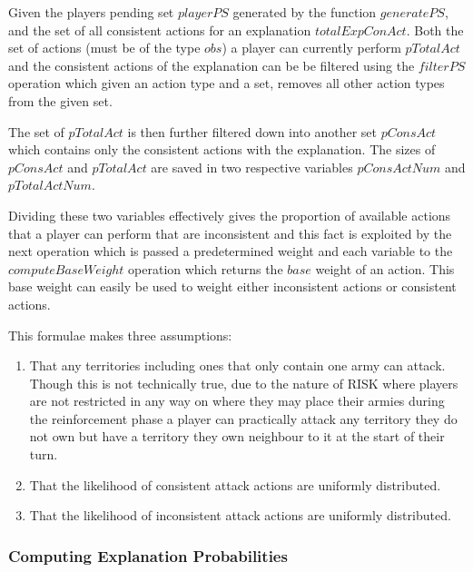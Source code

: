 \documentclass[parskip]{cs4rep}
\begin{document}
Given the players pending set $playerPS$ generated by the function $generatePS$, and the set of all consistent actions for an explanation $totalExpConAct$. Both the set of actions (must be of the type $obs$) a player can currently perform $pTotalAct$ and the consistent actions of the explanation can be be filtered using the $filterPS$ operation which given an action type and a set, removes all other action types from the given set. 

The set of $pTotalAct$ is then further filtered down into another set $pConsAct$ which contains only the consistent actions with the explanation. The sizes of $pConsAct$ and $pTotalAct$ are saved in two respective variables $pConsActNum$ and $pTotalActNum$.

Dividing these two variables effectively gives the proportion of available actions that a player can perform that are inconsistent and this fact is exploited by the next operation which is passed a predetermined weight and each variable to the $computeBaseWeight$ operation which returns the $base$ weight of an action. This base weight can easily be used to weight either inconsistent actions or consistent actions.

This formulae makes three assumptions:

\begin{enumerate}
\item
That any territories including ones that only contain one army can attack. Though this is not technically true, due to the nature of RISK where players are not restricted in any way on where they may place their armies during the reinforcement phase a player can practically attack any territory they do not own but have a territory they own neighbour to it at the start of their turn.
\item
That the likelihood of consistent attack actions are uniformly distributed.
\item
That the likelihood of inconsistent attack actions are uniformly distributed.
\end{enumerate}

\subsubsection{Computing Explanation Probabilities}
\end{document}
